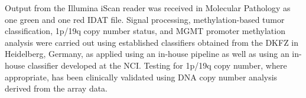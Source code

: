 Output from the Illumina iScan reader was received in Molecular Pathology as one green and one red IDAT file.
Signal processing, methylation-based tumor classification, 1p/19q copy number status, and MGMT promoter methylation analysis were carried out using established classifiers obtained from the DKFZ in Heidelberg, Germany, as applied using an in-house pipeline as well as using an in-house classifier developed at the NCI.
Testing for 1p/19q copy number, where appropriate, has been clinically validated using DNA copy number analysis derived from the array data.
